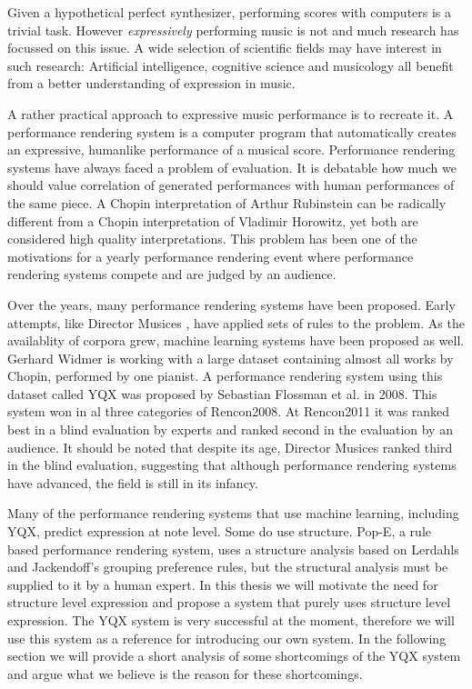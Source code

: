 \documentclass[a4paper,10pt]{article}
\begin{document}
Given a hypothetical perfect synthesizer, performing scores with computers is a trivial task. However \textit{expressively} performing music is not and much research has focussed on this issue. A wide selection of scientific fields may have interest in such research: Artificial intelligence, cognitive science and musicology all benefit from a better understanding of expression in music. 


A rather practical approach to expressive music performance is to recreate it. A performance rendering system is a computer program that automatically creates an expressive, humanlike performance of a musical score. Performance rendering systems have always faced a problem of evaluation. It is debatable how much we should value correlation of generated performances with human performances of the same piece. A Chopin interpretation of Arthur Rubinstein can be radically different from a Chopin interpretation of Vladimir Horowitz, yet both are considered high quality interpretations. This problem has been one of the motivations for a yearly performance rendering event where performance rendering systems compete and are judged by an audience. 

Over the years, many performance rendering systems have been proposed. Early attempts, like Director Musices \cite{friberg2000generating}, have applied sets of rules to the problem. As the availablity of corpora grew, machine learning systems have been proposed as well. Gerhard Widmer is working with a large dataset containing almost all works by Chopin, performed by one pianist. A performance rendering system using this dataset called YQX \cite{yqx} was proposed by Sebastian Flossman et al. in 2008. This system won in al three categories of Rencon2008. At Rencon2011 it was ranked best in a blind evaluation by experts and ranked second in the evaluation by an audience. It should be noted that despite its age, Director Musices ranked third in the blind evaluation, suggesting that although performance rendering systems have advanced, the field is still in its infancy.

Many of the performance rendering systems that use machine learning, including YQX, predict expression at note level. Some do use structure. Pop-E\cite{hashida2006pop}, a rule based performance rendering system, uses a structure analysis based on Lerdahls and Jackendoff's grouping preference rules, but the structural analysis must be supplied to it by a human expert. In this thesis we will motivate the need for structure level expression and propose a system that purely uses structure level expression. The YQX system is very successful at the moment, therefore we will use this system as a reference for introducing our own system. In the following section we will provide a short analysis of some shortcomings of the YQX system and argue what we believe is the reason for these shortcomings.
\end{document}
